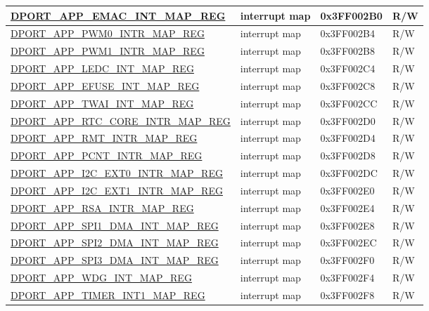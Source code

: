 \begin{longtable}{ |L{8.2cm} | L{4.5cm} | l | l | }
\hyperref[regdesc:APPEMACINTMAPREG]{DPORT\_APP\_EMAC\_INT\_MAP\_REG} & interrupt map & 0x3FF002B0 & R/W \\ \hline
\hyperref[regdesc:APPPWM0INTRMAPREG]{DPORT\_APP\_PWM0\_INTR\_MAP\_REG} & interrupt map & 0x3FF002B4 & R/W \\ \hline
\hyperref[regdesc:APPPWM1INTRMAPREG]{DPORT\_APP\_PWM1\_INTR\_MAP\_REG} & interrupt map & 0x3FF002B8 & R/W \\ \hline
\hyperref[regdesc:APPLEDCINTMAPREG]{DPORT\_APP\_LEDC\_INT\_MAP\_REG} & interrupt map & 0x3FF002C4 & R/W \\ \hline
\hyperref[regdesc:APPEFUSEINTMAPREG]{DPORT\_APP\_EFUSE\_INT\_MAP\_REG} & interrupt map & 0x3FF002C8 & R/W \\ \hline
\hyperref[regdesc:APPCANINTMAPREG]{DPORT\_APP\_TWAI\_INT\_MAP\_REG} & interrupt map & 0x3FF002CC & R/W \\ \hline
\hyperref[regdesc:APPRTCCOREINTRMAPREG]{DPORT\_APP\_RTC\_CORE\_INTR\_MAP\_REG} & interrupt map & 0x3FF002D0 & R/W \\ \hline
\hyperref[regdesc:APPRMTINTRMAPREG]{DPORT\_APP\_RMT\_INTR\_MAP\_REG} & interrupt map & 0x3FF002D4 & R/W \\ \hline
\hyperref[regdesc:APPPCNTINTRMAPREG]{DPORT\_APP\_PCNT\_INTR\_MAP\_REG} & interrupt map & 0x3FF002D8 & R/W \\ \hline
\hyperref[regdesc:APPI2CEXT0INTRMAPREG]{DPORT\_APP\_I2C\_EXT0\_INTR\_MAP\_REG} & interrupt map & 0x3FF002DC & R/W \\ \hline
\hyperref[regdesc:APPI2CEXT1INTRMAPREG]{DPORT\_APP\_I2C\_EXT1\_INTR\_MAP\_REG} & interrupt map & 0x3FF002E0 & R/W \\ \hline
\hyperref[regdesc:APPRSAINTRMAPREG]{DPORT\_APP\_RSA\_INTR\_MAP\_REG} & interrupt map & 0x3FF002E4 & R/W \\ \hline
\hyperref[regdesc:APPSPI1DMAINTMAPREG]{DPORT\_APP\_SPI1\_DMA\_INT\_MAP\_REG} & interrupt map & 0x3FF002E8 & R/W \\ \hline
\hyperref[regdesc:APPSPI2DMAINTMAPREG]{DPORT\_APP\_SPI2\_DMA\_INT\_MAP\_REG} & interrupt map & 0x3FF002EC & R/W \\ \hline
\hyperref[regdesc:APPSPI3DMAINTMAPREG]{DPORT\_APP\_SPI3\_DMA\_INT\_MAP\_REG} & interrupt map & 0x3FF002F0 & R/W \\ \hline
\hyperref[regdesc:APPWDGINTMAPREG]{DPORT\_APP\_WDG\_INT\_MAP\_REG} & interrupt map & 0x3FF002F4 & R/W \\ \hline
\hyperref[regdesc:APPTIMERINT1MAPREG]{DPORT\_APP\_TIMER\_INT1\_MAP\_REG} & interrupt map & 0x3FF002F8 & R/W \\ \hline

\end{longtable}

